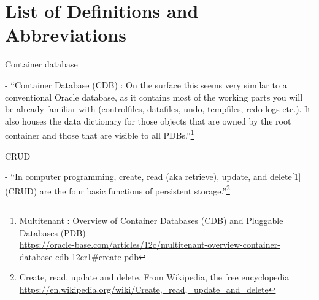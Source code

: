 

\newpage
\setcounter{secnumdepth}{0}
\section{List of Definitions and Abbreviations}

\noindent\begin{itemize*}

\item{\begin{bf}Container database\end{bf}} - ``Container Database (CDB) : On 
the surface this seems very similar to a conventional Oracle database, as it 
contains most of the working parts you will be already familiar with 
(controlfiles, datafiles, undo, tempfiles, redo logs etc.). It also houses 
the data dictionary for those objects that are owned by the root container 
and those that are visible to all PDBs.''\footnote{Multitenant : Overview of Container Databases (CDB) and Pluggable Databases (PDB)\\
\href{https://oracle-base.com/articles/12c/multitenant-overview-container-database-cdb-12cr1\#create-pdb}{https://oracle-base.com/articles/12c/multitenant-overview-container-database-cdb-12cr1\#create-pdb}}

\item{\begin{bf}CRUD\end{bf}} - ``In computer programming,
  create, read (aka retrieve), update, and delete[1] (CRUD)
  are the four basic functions of persistent storage.''\footnote{Create, read, update and delete, From Wikipedia, the free encyclopedia\\
    \href{https://en.wikipedia.org/wiki/Create,\_read,\_update\_and\_delete}{https://en.wikipedia.org/wiki/Create,\_read,\_update\_and\_delete}}


\end{itemize*}

